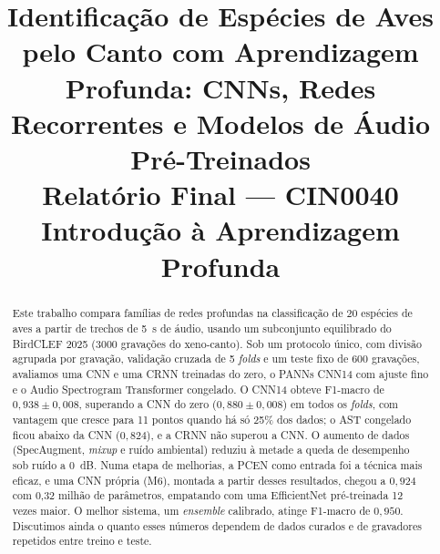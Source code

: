 \documentclass[conference]{IEEEtran}
\begin{document}
\title{Identificação de Espécies de Aves pelo Canto com Aprendizagem Profunda: CNNs, Redes Recorrentes e Modelos de Áudio Pré-Treinados\\[4pt]
\large Relatório Final --- CIN0040 Introdução à Aprendizagem Profunda}

\author{
\and
{}
}

\maketitle

\begin{abstract}
Este trabalho compara famílias de redes profundas na classificação de 20 espécies de aves a partir de trechos de 5~s de áudio, usando um subconjunto equilibrado do BirdCLEF 2025 (3000 gravações do xeno-canto). Sob um protocolo único, com divisão agrupada por gravação, validação cruzada de 5 \textit{folds} e um teste fixo de 600 gravações, avaliamos uma CNN e uma CRNN treinadas do zero, o PANNs CNN14 com ajuste fino e o Audio Spectrogram Transformer congelado. O CNN14 obteve F1-macro de $0{,}938 \pm 0{,}008$, superando a CNN do zero ($0{,}880 \pm 0{,}008$) em todos os \textit{folds}, com vantagem que cresce para 11 pontos quando há só 25\% dos dados; o AST congelado ficou abaixo da CNN ($0{,}824$), e a CRNN não superou a CNN. O aumento de dados (SpecAugment, \textit{mixup} e ruído ambiental) reduziu à metade a queda de desempenho sob ruído a 0~dB. Numa etapa de melhorias, a PCEN como entrada foi a técnica mais eficaz, e uma CNN própria (M6), montada a partir desses resultados, chegou a $0{,}924$ com 0{,}32 milhão de parâmetros, empatando com uma EfficientNet pré-treinada 12 vezes maior. O melhor sistema, um \textit{ensemble} calibrado, atinge F1-macro de $0{,}950$. Discutimos ainda o quanto esses números dependem de dados curados e de gravadores repetidos entre treino e teste.
\end{abstract}
\end{document}
